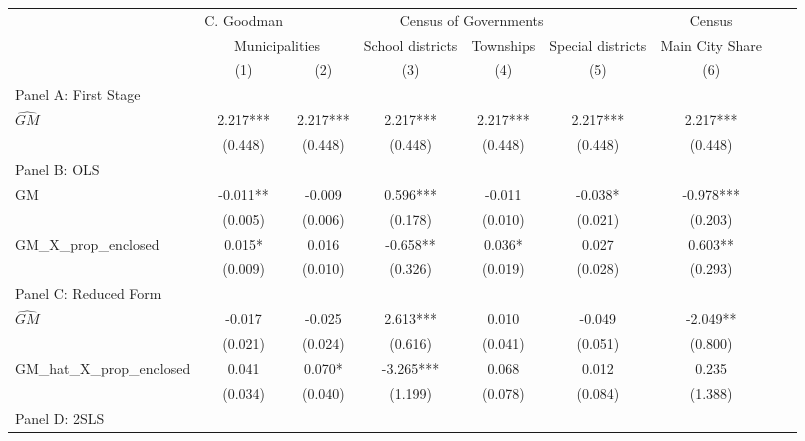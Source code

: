  \begin{tabular}{l*{8}{c}} \toprule
&\multicolumn{1}{c}{C. Goodman}&\multicolumn{4}{c}{Census of Governments}&\multicolumn{1}{c}{Census}\\\cmidrule(lr){2-2}\cmidrule(lr){3-6}\cmidrule(lr){7-7}
&\multicolumn{2}{c}{Municipalities}&\multicolumn{1}{c}{School districts}&\multicolumn{1}{c}{Townships}&\multicolumn{1}{c}{Special districts}&\multicolumn{1}{c}{Main City Share}\\\cmidrule(lr){2-3}\cmidrule(lr){4-6}\cmidrule(lr){7-7}
&\multicolumn{1}{c}{(1)}&\multicolumn{1}{c}{(2)}&\multicolumn{1}{c}{(3)}&\multicolumn{1}{c}{(4)}&\multicolumn{1}{c}{(5)}&\multicolumn{1}{c}{(6)}\\
\cmidrule(lr){1-7}
\multicolumn{6}{l}{Panel A: First Stage}\\
\cmidrule(lr){1-7}
$\widehat{GM}$  &    2.217***&    2.217***&    2.217***&    2.217***&    2.217***&    2.217***\\
                &  (0.448)   &  (0.448)   &  (0.448)   &  (0.448)   &  (0.448)   &  (0.448)   \\
\cmidrule(lr){1-7}
\multicolumn{6}{l}{Panel B: OLS}\\
\cmidrule(lr){1-7}
GM              &   -0.011** &   -0.009   &    0.596***&   -0.011   &   -0.038*  &   -0.978***\\
                &  (0.005)   &  (0.006)   &  (0.178)   &  (0.010)   &  (0.021)   &  (0.203)   \\
\addlinespace
GM\_X\_prop\_enclosed&    0.015*  &    0.016   &   -0.658** &    0.036*  &    0.027   &    0.603** \\
                &  (0.009)   &  (0.010)   &  (0.326)   &  (0.019)   &  (0.028)   &  (0.293)   \\
\cmidrule(lr){1-7}
\multicolumn{6}{l}{Panel C: Reduced Form}\\
\cmidrule(lr){1-7}
$\widehat{GM}$  &   -0.017   &   -0.025   &    2.613***&    0.010   &   -0.049   &   -2.049** \\
                &  (0.021)   &  (0.024)   &  (0.616)   &  (0.041)   &  (0.051)   &  (0.800)   \\
\addlinespace
GM\_hat\_X\_prop\_enclosed&    0.041   &    0.070*  &   -3.265***&    0.068   &    0.012   &    0.235   \\
                &  (0.034)   &  (0.040)   &  (1.199)   &  (0.078)   &  (0.084)   &  (1.388)   \\
\cmidrule(lr){1-7}
\multicolumn{6}{l}{Panel D: 2SLS}\\
\cmidrule(lr){1-7}

\end{tabular}
